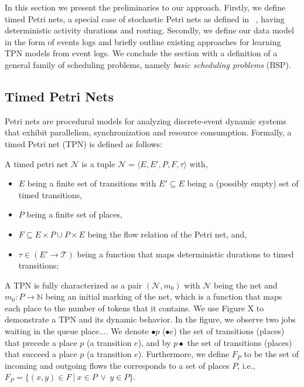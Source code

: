 \label{sec:preliminaries}

In this section we present 
the preliminaries to 
our approach. Firstly, we define timed Petri nets, a special case of 
stochastic Petri nets as defined in ~\cite[Chapter 2]{haas2002stochastic},
having 
deterministic activity durations and routing. 
Secondly, we define our data model in the form of events logs and 
briefly outline existing approaches
for learning TPN models from event logs. We conclude the section with a
definition of a general family of scheduling problems,
namely \emph{basic scheduling problems} (BSP).

\subsection{Timed Petri Nets}

Petri nets are procedural 
models 
for analyzing discrete-event dynamic systems that exhibit 
parallelism, synchronization and resource consumption.
Formally, a timed Petri net (TPN) is defined as follows: \begin{mydef}  \label{def:tpn}
	A timed petri net $\mathcal{N}$ is a 
	tuple $\mathcal{N} = \langle E, E',P, F, \tau\rangle$ with,
	\begin{itemize}
		\item $E$ being a finite set of transitions with $E' \subseteq E$ being a (possibly empty) set of timed transitions, 
		\item $P$ being a finite set of places,
		\item $F \subseteq E \times P \cup P \times E $ being the flow relation of the Petri net, and, 
		\item $\tau \in (E' \rightarrow \mathcal{T})$ being a function that maps deterministic durations
		to timed transitions;
	\end{itemize} 
\end{mydef} A TPN is fully characterized as 
a pair $(\mathcal{N}, m_0)$ with $\mathcal{N}$ being the net and $m_0: P \rightarrow \mathbb{N}$ being an initial marking of the net, which is a 
function that maps each place to the number of tokens that it contains. We use Figure X to demonstrate a TPN and its dynamic behavior. In the figure, we observe two jobs waiting in the queue place....  We denote $\bullet p$ ($\bullet e$) the set of
transitions (places) that precede a place $p$ (a transition $e$), and by $p \bullet$ the 
set of transitions (places) that succeed a place $p$ (a transition $e$). 
Furthermore, we define $F_P$ to be the 
set of incoming and outgoing flows the 
corresponds to a set of places $P$, i.e.,
$F_P = \{(x,y) \in F \ |\ x \in P \ \lor \ y \in P \}$.


